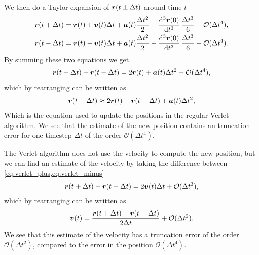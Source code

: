 We then do a Taylor expansion of $\boldsymbol{r}(t \pm \Delta t)$ around time $t$
\begin{align}
    \rvec(t + \Delta t) &= \rvec(t) + \vvec(t)\Delta t + \avec(t)\frac{\Delta t^2}{2} + \dod[3]{\rvec(0)}{t}\frac{\Delta t^3}{6} + \mathcal{O}(\Delta t^4), \label{eq:verlet_plus}\\
    \rvec(t - \Delta t) &= \rvec(t) - \vvec(t)\Delta t + \avec(t)\frac{\Delta t^2}{2} - \dod[3]{\rvec(0)}{t}\frac{\Delta t^3}{6} + \mathcal{O}(\Delta t^4).\label{eq:verlet_minus}
\end{align}
By summing these two equations we get
\begin{align*}
    \boldsymbol{r}(t + \Delta t) + \boldsymbol{r}(t - \Delta t) = 2\boldsymbol{r}(t) + \boldsymbol{a}(t)\Delta t^2 + \mathcal{O}(\Delta t^4),
\end{align*}
which by rearranging can be written as
\begin{align*}
    \boldsymbol{r}(t + \Delta t) \approx 2\boldsymbol{r}(t) - \boldsymbol{r}(t - \Delta t) + \boldsymbol{a}(t)\Delta t^2,
\end{align*}
Which is the equation used to update the positions in the regular Verlet algorithm. We see that the estimate of the new position contains an truncation error for one timestep $\Delta t$ of the order $\mathcal{O}(\Delta t^4)$.

The Verlet algorithm does not use the velocity to compute the new position, but we can find an estimate of the velocity by taking the difference between \cref{eq:verlet_plus,eq:verlet_minus}
\begin{align*}
    \boldsymbol{r}(t + \Delta t) - \boldsymbol{r}(t - \Delta t) = 2\boldsymbol{v}(t)\Delta t + \mathcal{O}(\Delta t^3),
\end{align*}
which by rearranging can be written as
\begin{align*}
    \boldsymbol{v}(t) = \frac{\boldsymbol{r}(t + \Delta t) - \boldsymbol{r}(t - \Delta t)}{2\Delta t} + \mathcal{O}(\Delta t^2).
\end{align*}
We see that this estimate of the velocity has a truncation error of the order $\mathcal{O}(\Delta t^2)$, compared to the error in the position $\mathcal{O}(\Delta t^4)$.

